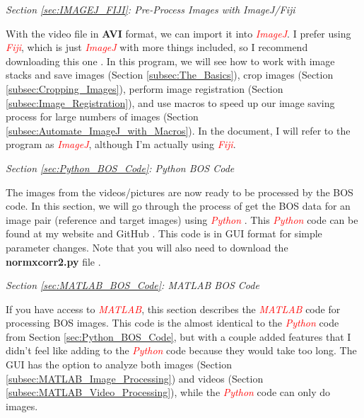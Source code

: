 \documentclass[letterpaper,12pt]{article}
\begin{document}
\newpage
\vspace{2em}
\noindent \emph{Section \ref{sec:IMAGEJ_FIJI}: Pre-Process Images with \textit{ImageJ}/\textit{Fiji}}
\vspace{1em}

With the video file in \textbf{AVI} format, we can import it into \textcolor{red}{\textit{ImageJ}}.  I prefer using \textcolor{red}{\textit{Fiji}}, which is just \textcolor{red}{\textit{ImageJ}} with more things included, so I recommend downloading this one \cite{Fiji}.  In this program, we will see how to work with image stacks and save images (Section \ref{subsec:The_Basics}), crop images (Section \ref{subsec:Cropping_Images}), perform image registration (Section \ref{subsec:Image_Registration}), and use macros to speed up our image saving process for large numbers of images (Section \ref{subsec:Automate_ImageJ_with_Macros}).  In the document, I will refer to the program as \textcolor{red}{\textit{ImageJ}}, although I'm actually using \textcolor{red}{\textit{Fiji}}.

\vspace{1em}
\noindent \emph{Section \ref{sec:Python_BOS_Code}: Python BOS Code}
\vspace{1em}

The images from the videos/pictures are now ready to be processed by the BOS code.  In this section, we will go through the process of get the BOS data for an image pair (reference and target images) using \textcolor{red}{\textit{Python}} \cite{Python}.  This \textcolor{red}{\textit{Python}} code can be found at my website \cite{JTE_Website} and GitHub \cite{JTE_GitHub}.  This code is in GUI format for simple parameter changes.  Note that you will also need to download the \textbf{normxcorr2.py} file \cite{Sabrewarrior_GitHub}.

\vspace{1em}
\noindent \emph{Section \ref{sec:MATLAB_BOS_Code}: MATLAB BOS Code}
\vspace{1em}

If you have access to \textcolor{red}{\textit{MATLAB}}, this section describes the \textcolor{red}{\textit{MATLAB}} code for processing BOS images.  This code is the almost identical to the \textcolor{red}{\textit{Python}} code from Section \ref{sec:Python_BOS_Code}, but with a couple added features that I didn't feel like adding to the \textcolor{red}{\textit{Python}} code because they would take too long.  The GUI has the option to analyze both images (Section \ref{subsec:MATLAB_Image_Processing}) and videos (Section \ref{subsec:MATLAB_Video_Processing}), while the \textcolor{red}{\textit{Python}} code can only do images.
\end{document}
